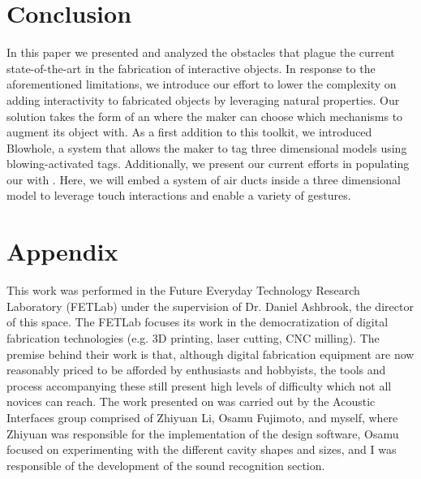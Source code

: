   \section{Conclusion}
    In this paper we presented and analyzed the obstacles that plague the
    current state-of-the-art in the fabrication of interactive objects. In
    response to the aforementioned limitations, we introduce  our effort to
    lower the complexity on adding interactivity to fabricated objects by
    leveraging natural properties. Our solution takes the form of an \itoolkit
    where the maker can choose which mechanisms to augment its object with. As
    a first addition to this toolkit, we introduced Blowhole, a system that
    allows the maker to tag three dimensional models using blowing-activated
    tags. Additionally, we present our current efforts in populating our
    \itoolkit with \at. Here, we will embed a system of air ducts inside a
    three dimensional model to leverage touch interactions and enable a variety
    of gestures.

  
  

  \newpage
  \section{Appendix}
    This work was performed in the Future Everyday Technology Research
    Laboratory (FETLab) under the supervision of Dr. Daniel Ashbrook, the
    director of this space. The FETLab focuses its work in the democratization
    of digital fabrication technologies (e.g. 3D printing, laser cutting, CNC
    milling). The premise behind their work is that, although digital
    fabrication equipment are now reasonably priced to be afforded by
    enthusiasts and hobbyists, the tools and process accompanying these still
    present high levels of difficulty which not all novices can reach. The work
    presented on \bh was carried out by the Acoustic Interfaces group comprised
    of Zhiyuan Li, Osamu Fujimoto, and myself, where Zhiyuan was responsible
    for the implementation of the design software, Osamu focused on
    experimenting with the different cavity shapes and sizes, and I was
    responsible of the development of the sound recognition section.


